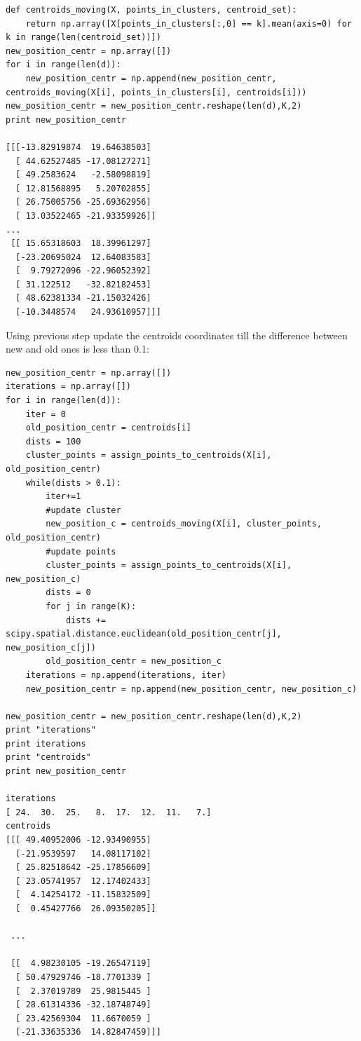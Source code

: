 \documentclass[a4paper, 12pt]{article}
\begin{document}
\begin{lstlisting}
def centroids_moving(X, points_in_clusters, centroid_set):
    return np.array([X[points_in_clusters[:,0] == k].mean(axis=0) for k in range(len(centroid_set))])
new_position_centr = np.array([])
for i in range(len(d)):
    new_position_centr = np.append(new_position_centr, centroids_moving(X[i], points_in_clusters[i], centroids[i]))
new_position_centr = new_position_centr.reshape(len(d),K,2)
print new_position_centr

[[[-13.82919874  19.64638503]
  [ 44.62527485 -17.08127271]
  [ 49.2583624   -2.58098819]
  [ 12.81568895   5.20702855]
  [ 26.75005756 -25.69362956]
  [ 13.03522465 -21.93359926]]
...
 [[ 15.65318603  18.39961297]
  [-23.20695024  12.64083583]
  [  9.79272096 -22.96052392]
  [ 31.122512   -32.82182453]
  [ 48.62381334 -21.15032426]
  [-10.3448574   24.93610957]]]
\end{lstlisting}

Using previous step update the centroids coordinates till the difference between new and old ones is less than 0.1:

\begin{lstlisting}
new_position_centr = np.array([])
iterations = np.array([])
for i in range(len(d)):
    iter = 0
    old_position_centr = centroids[i]
    dists = 100
    cluster_points = assign_points_to_centroids(X[i], old_position_centr)
    while(dists > 0.1):
        iter+=1
        #update cluster
        new_position_c = centroids_moving(X[i], cluster_points, old_position_centr)
        #update points
        cluster_points = assign_points_to_centroids(X[i], new_position_c)
        dists = 0
        for j in range(K):
            dists += scipy.spatial.distance.euclidean(old_position_centr[j], new_position_c[j])
        old_position_centr = new_position_c
    iterations = np.append(iterations, iter)
    new_position_centr = np.append(new_position_centr, new_position_c)

new_position_centr = new_position_centr.reshape(len(d),K,2)
print "iterations"
print iterations
print "centroids"
print new_position_centr

iterations
[ 24.  30.  25.   8.  17.  12.  11.   7.]
centroids
[[[ 49.40952006 -12.93490955]
  [-21.9539597   14.08117102]
  [ 25.82518642 -25.17856609]
  [ 23.05741957  12.17402433]
  [  4.14254172 -11.15832509]
  [  0.45427766  26.09350205]]

 ...

 [[  4.98230105 -19.26547119]
  [ 50.47929746 -18.7701339 ]
  [  2.37019789  25.9815445 ]
  [ 28.61314336 -32.18748749]
  [ 23.42569304  11.6670059 ]
  [-21.33635336  14.82847459]]]
\end{lstlisting}
\end{document}
